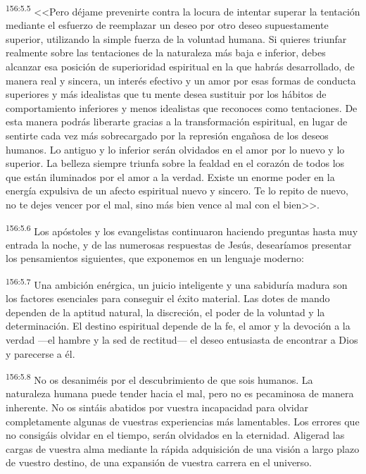 \par 
\textsuperscript{156:5.5} <<Pero déjame prevenirte contra la locura de intentar superar la tentación mediante el esfuerzo de reemplazar un deseo por otro deseo supuestamente superior, utilizando la simple fuerza de la voluntad humana. Si quieres triunfar realmente sobre las tentaciones de la naturaleza más baja e inferior, debes alcanzar esa posición de superioridad espiritual en la que habrás desarrollado, de manera real y sincera, un interés efectivo y un amor por esas formas de conducta superiores y más idealistas que tu mente desea sustituir por los hábitos de comportamiento inferiores y menos idealistas que reconoces como tentaciones. De esta manera podrás liberarte gracias a la transformación espiritual, en lugar de sentirte cada vez más sobrecargado por la represión engañosa de los deseos humanos. Lo antiguo y lo inferior serán olvidados en el amor por lo nuevo y lo superior. La belleza siempre triunfa sobre la fealdad en el corazón de todos los que están iluminados por el amor a la verdad. Existe un enorme poder en la energía expulsiva de un afecto espiritual nuevo y sincero. Te lo repito de nuevo, no te dejes vencer por el mal, sino más bien vence al mal con el bien>>.

\par 
\textsuperscript{156:5.6} Los apóstoles y los evangelistas continuaron haciendo preguntas hasta muy entrada la noche, y de las numerosas respuestas de Jesús, desearíamos presentar los pensamientos siguientes, que exponemos en un lenguaje moderno:

\par 
\textsuperscript{156:5.7} Una ambición enérgica, un juicio inteligente y una sabiduría madura son los factores esenciales para conseguir el éxito material. Las dotes de mando dependen de la aptitud natural, la discreción, el poder de la voluntad y la determinación. El destino espiritual depende de la fe, el amor y la devoción a la verdad ---el hambre y la sed de rectitud--- el deseo entusiasta de encontrar a Dios y parecerse a él.

\par 
\textsuperscript{156:5.8} No os desaniméis por el descubrimiento de que sois humanos. La naturaleza humana puede tender hacia el mal, pero no es pecaminosa de manera inherente. No os sintáis abatidos por vuestra incapacidad para olvidar completamente algunas de vuestras experiencias más lamentables. Los errores que no consigáis olvidar en el tiempo, serán olvidados en la eternidad. Aligerad las cargas de vuestra alma mediante la rápida adquisición de una visión a largo plazo de vuestro destino, de una expansión de vuestra carrera en el universo.

